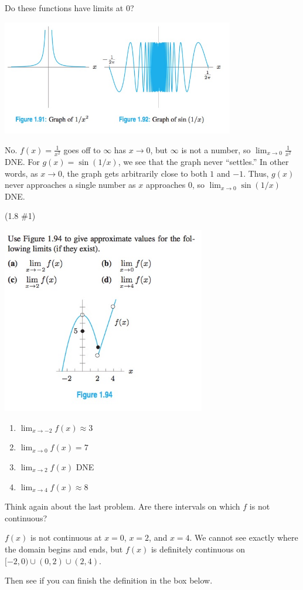 \documentclass[11pt]{exam}
\begin{document}
\begin{questions}
\question Do these functions have limits at 0?

\includegraphics[width=4in]{nolimits.jpg}



\vspace*{-0.9cm}
\begin{solution}
  No. \(f(x) = \frac{1}{x^2}\) goes off to \(\infty\) has \(x \to 0\),
  but \(\infty\) is not a number, so \(\lim_{x\to 0} \frac{1}{x^2}\)
  DNE. For \(g(x) = \sin(1/x)\), we see that the graph never
  ``settles.'' In other words, as \(x \to 0\), the graph gets
  arbitrarily close to both \(1\) and \(-1\). Thus, \(g(x)\) never
  approaches a single number as \(x\) approaches \(0\), so \(\lim_{x
    \to 0} \sin(1/x)\) DNE.
\end{solution}
\question (1.8 \#1)

\includegraphics[width=3.5in]{no1.jpg}

\vspace*{-0.8cm}
\begin{solution}
  \begin{enumerate}
  \item \(\lim_{x\to-2} f(x) \approx 3\)
  \item \(\lim_{x\to 0} f(x) = 7\)
  \item \(\lim_{x \to 2} f(x)\) DNE
  \item \(\lim_{x\to 4} f(x) \approx 8\) 
  \end{enumerate}
\end{solution}
\question Think again about the last problem.  Are there intervals on
which $f$ is not continuous?
\begin{solution}
  \(f(x)\) is not continuous at \(x=0\), \(x=2\), and \(x=4\). We
  cannot see exactly where the domain begins and ends, but \(f(x)\) is
  definitely continuous on \([-2,0) \cup (0,2) \cup (2,4)\).
\end{solution}
Then see if you can finish the definition in the box below.


\end{questions}
\end{document}
